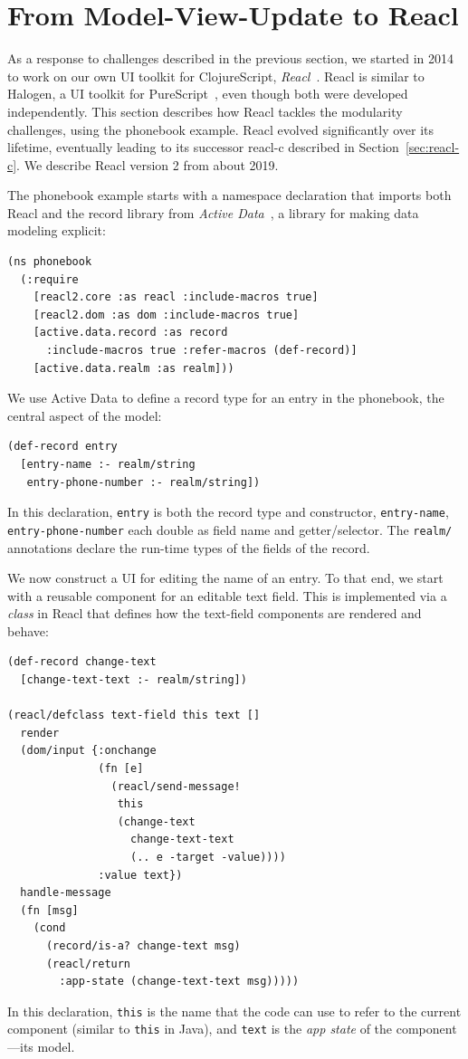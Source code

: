 \documentclass[sigplan,screen]{acmart}
\begin{document}
\section{From Model-View-Update to Reacl}
\label{sec:reacl}

As a response to challenges described in the previous section, we
started in 2014 to work on our own UI toolkit for ClojureScript,
\textit{Reacl}~\cite{Reacl}.  Reacl is similar to Halogen, a UI
toolkit for PureScript~\cite{Halogen}, even though both were developed
independently.
This section describes how Reacl tackles
the modularity challenges, using the phonebook example.  Reacl evolved
significantly over its lifetime, eventually leading to its successor
reacl-c described in Section~\ref{sec:reacl-c}.  We describe Reacl version 2
from about 2019.

The phonebook example starts with a namespace declaration that imports
both Reacl and the record library from \textit{Active
  Data}~\cite{ActiveData}, a library for making data modeling
explicit:
%
\begin{verbatim}
(ns phonebook
  (:require
    [reacl2.core :as reacl :include-macros true]
    [reacl2.dom :as dom :include-macros true]
    [active.data.record :as record
      :include-macros true :refer-macros (def-record)]
    [active.data.realm :as realm]))
\end{verbatim}
%
We use Active Data to define a record type for an entry in the
phonebook, the central aspect of the model:
%
\begin{verbatim}
(def-record entry
  [entry-name :- realm/string
   entry-phone-number :- realm/string])
\end{verbatim}
%
In this declaration, \texttt{entry} is both the record type and
constructor, \texttt{entry-name},
\texttt{entry-phone-number} each double as field name and
getter/selector.  The \texttt{realm/} annotations declare the run-time
types of the fields of the record.

We now construct a UI for editing the name of an entry.  To that end,
we start with a reusable component for an editable text field.  This
is implemented via a \textit{class} in Reacl that defines how the
text-field components are rendered and behave:
%
\begin{verbatim}
(def-record change-text
  [change-text-text :- realm/string])

(reacl/defclass text-field this text []
  render
  (dom/input {:onchange 
              (fn [e]
                (reacl/send-message!
                 this
                 (change-text
                   change-text-text
                   (.. e -target -value))))
              :value text})
  handle-message
  (fn [msg]
    (cond
      (record/is-a? change-text msg)
      (reacl/return
        :app-state (change-text-text msg)))))
\end{verbatim}
%
In this declaration, \texttt{this} is the name that the code can use
to refer to the current component (similar to \texttt{this} in Java),
and \texttt{text} is the \textit{app state} of the component---its
model.
\end{document}
